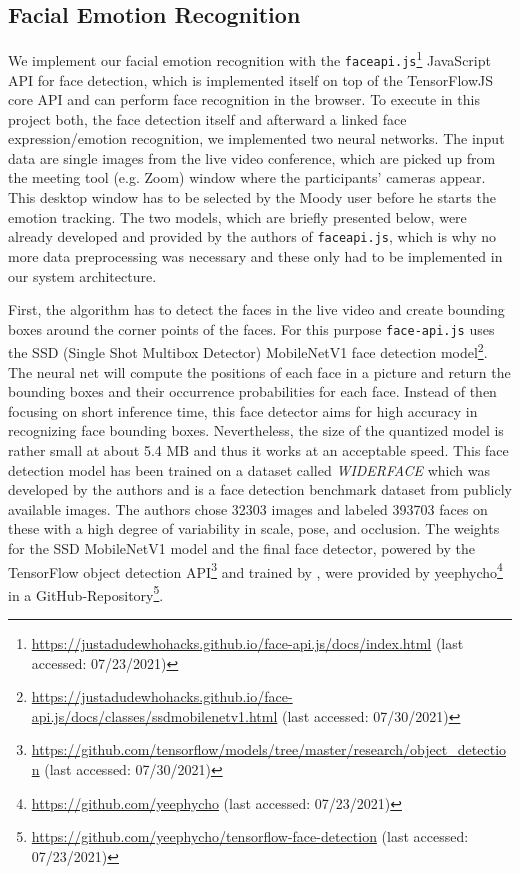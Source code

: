 \subsection{Facial Emotion Recognition}
\label{subsec:method_facial_emotion_recognition}
We implement our facial emotion recognition with the \texttt{faceapi.js}\footnote{\url{https://justadudewhohacks.github.io/face-api.js/docs/index.html} (last accessed: 07/23/2021)} JavaScript API for face detection, which is implemented itself on top of the TensorFlowJS core API and can perform face recognition in the browser. To execute in this project both, the face detection itself and afterward a linked face expression/emotion recognition, we implemented two neural networks. The input data are single images from the live video conference, which are picked up from the meeting tool (e.g. Zoom) window where the participants' cameras appear. This desktop window has to be selected by the Moody user before he starts the emotion tracking. The two models, which are briefly presented below, were already developed and provided by the authors of \texttt{faceapi.js}, which is why no more data preprocessing was necessary and these only had to be implemented in our system architecture.

First, the algorithm has to detect the faces in the live video and create bounding boxes around the corner points of the faces. For this purpose \texttt{face-api.js} uses the SSD (Single Shot Multibox Detector) MobileNetV1 face detection model\footnote{\url{https://justadudewhohacks.github.io/face-api.js/docs/classes/ssdmobilenetv1.html} (last accessed: 07/30/2021)}. The neural net will compute the positions of each face in a picture and return the bounding boxes and their occurrence probabilities for each face. Instead of then focusing on short inference time, this face detector aims for high accuracy in recognizing face bounding boxes. Nevertheless, the size of the quantized model is rather small at about 5.4 MB and thus it works at an acceptable speed. This face detection model has been trained on a dataset called 
\emph{WIDERFACE} which was developed by the authors  and is a face detection benchmark dataset from publicly available images. The authors chose 32303 images and labeled 393703 faces on these with a high degree of variability in scale, pose, and occlusion. The weights for the SSD MobileNetV1 model and the final face detector, powered by the TensorFlow object detection API\footnote{\url{https://github.com/tensorflow/models/tree/master/research/object_detection} (last accessed: 07/30/2021)} and trained by , were provided by yeephycho\footnote{\url{https://github.com/yeephycho} (last accessed: 07/23/2021)} in a GitHub-Repository\footnote{\url{https://github.com/yeephycho/tensorflow-face-detection} (last accessed: 07/23/2021)}.

